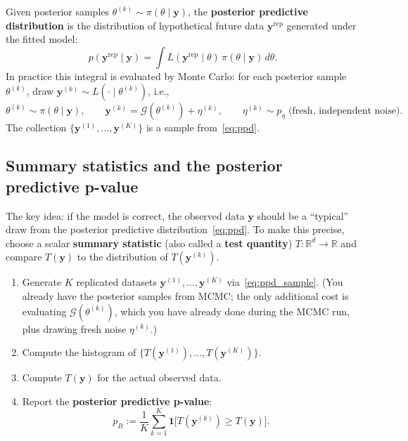 \documentclass[11pt]{article}
\newcommand{\R}{\mathbb{R}}
\newcommand{\cG}{\mathcal{G}}
\theoremstyle{plain}
\theoremstyle{remark}
\theoremstyle{definition}
\begin{document}
Given posterior samples $\theta^{(k)} \sim \pi(\theta \mid \mathbf{y})$, the 
\textbf{posterior predictive distribution} is the distribution of hypothetical 
future data $\mathbf{y}^{\text{rep}}$ generated under the fitted model:
\begin{equation}\label{eq:ppd}
p(\mathbf{y}^{\text{rep}} \mid \mathbf{y}) 
= \int L(\mathbf{y}^{\text{rep}} \mid \theta)\,\pi(\theta \mid \mathbf{y})\,d\theta.
\end{equation}
In practice this integral is evaluated by Monte Carlo: for each posterior 
sample $\theta^{(k)}$, draw $\mathbf{y}^{(k)} \sim L(\cdot \mid \theta^{(k)})$, 
i.e.,
\begin{equation}\label{eq:ppd_sample}
\theta^{(k)} \sim \pi(\theta \mid \mathbf{y}), \qquad
\mathbf{y}^{(k)} = \cG(\theta^{(k)}) + \eta^{(k)}, \qquad
\eta^{(k)} \sim p_\eta \;\text{(fresh, independent noise)}.
\end{equation}
The collection $\{\mathbf{y}^{(1)}, \ldots, \mathbf{y}^{(K)}\}$ is a sample 
from~\eqref{eq:ppd}.

\subsection{Summary statistics and the posterior predictive p-value}

The key idea: if the model is correct, the observed data $\mathbf{y}$ should 
be a ``typical'' draw from the posterior predictive 
distribution~\eqref{eq:ppd}. To make this precise, choose a scalar 
\textbf{summary statistic} (also called a \textbf{test quantity}) 
$T: \R^d \to \R$ and compare $T(\mathbf{y})$ to the distribution of 
$T(\mathbf{y}^{(k)})$.

\begin{enumerate}[label=\textbf{Step \arabic*.}]
\item Generate $K$ replicated datasets $\mathbf{y}^{(1)}, \ldots, 
  \mathbf{y}^{(K)}$ via~\eqref{eq:ppd_sample}. (You already have 
  the posterior samples from MCMC; the only additional cost is 
  evaluating $\cG(\theta^{(k)})$, which you have already done during 
  the MCMC run, plus drawing fresh noise $\eta^{(k)}$.)
\item Compute the histogram of $\{T(\mathbf{y}^{(1)}), \ldots, 
  T(\mathbf{y}^{(K)})\}$.
\item Compute $T(\mathbf{y})$ for the actual observed data.
\item Report the \textbf{posterior predictive p-value}:
  \begin{equation}\label{eq:ppp}
  p_B := \frac{1}{K}\sum_{k=1}^K \mathbf{1}\bigl[T(\mathbf{y}^{(k)}) 
  \geq T(\mathbf{y})\bigr].
  \end{equation}
\end{enumerate}
\end{document}

